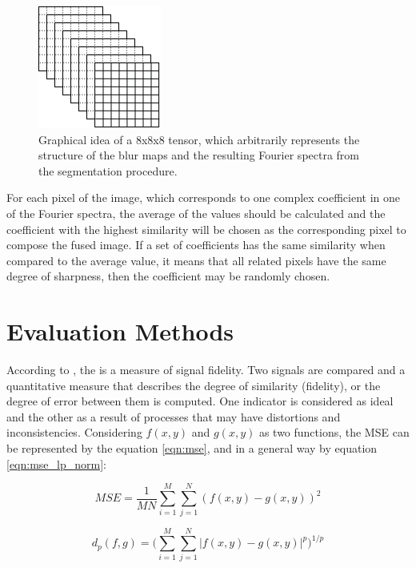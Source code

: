 \begin{figure}[H]
	\centering
	\caption{\label{fig:tensor}Graphical idea of a $8$x$8$x$8$ tensor, which arbitrarily represents the structure of the blur maps and the resulting Fourier spectra from the segmentation procedure.}
	\begin{center}
	    \includegraphics[scale=0.8]{images/fig15.png}
	\end{center}
	\centering
    \fautor
\end{figure}

\noindent For each pixel of the image, which corresponds to one complex coefficient in one of the Fourier spectra, the average of the values should be calculated and the coefficient with the highest similarity will be chosen as the corresponding pixel to compose the fused image. If a set of coefficients has the same similarity when compared to the average value, it means that all related pixels have the same degree of sharpness, then the coefficient may be randomly chosen. 




\section{Evaluation Methods}

According to , the  is a measure of signal fidelity. Two signals are compared and a quantitative measure that describes the degree of similarity (fidelity), or the degree of error between them is computed. One indicator is considered as ideal and the other as a result of processes that may have distortions and inconsistencies. Considering $f (x, y)$ and $g (x, y)$ as two functions, the MSE can be represented by the equation \ref{eqn:mse}, and in a general way by equation \ref{eqn:mse_lp_norm}:

\begin{equation}
\label{eqn:mse}
	MSE =  \frac{1}{MN}\sum_{i=1}^{M}\sum_{j=1}^{N}(f(x,y) - g(x,y))^2
\end{equation}

\begin{equation}
\label{eqn:lp_norm2}
	d_p(f,g) = \Bigg(\sum_{i=1}^{M}\sum_{j=1}^{N}|f(x,y) - g(x,y)|^{p}\Bigg)^{1/p}
\end{equation}

